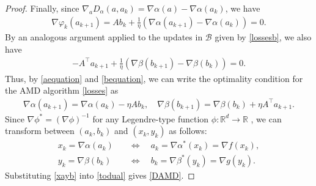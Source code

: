\documentclass[11pt]{article}
\newcommand{\R}{\mathbb{R}}
\newcommand{\B}{\mathcal{B}}
\begin{document}
\begin{proof}
    Finally, since $\nabla_{a}D_{\alpha}\left(a,a_{k}\right)=\nabla\alpha(a)-\nabla\alpha\left(a_{k}\right)$, we have
    \begin{gather}
        \nabla\varphi_k\left(a_{k+1}\right)=Ab_{k}+\frac{1}{\eta}\left(\nabla\alpha\left(a_{k+1}\right)-\nabla\alpha\left(a_{k}\right)\right)=0.\label{aequation}
    \end{gather}
    By an analogous argument applied to the updates in $\B$ given by \eqref{lossesb}, we also have
    \begin{gather}
        -A^{\top}a_{k+1}+\frac{1}{\eta}\left(\nabla\beta\left(b_{k+1}\right)-\nabla\beta\left(b_{k}\right)\right)=0.\label{bequation}
    \end{gather}
    Thus, by \eqref{aequation} and \eqref{bequation}, we can write the optimality condition for the AMD algorithm \eqref{losses} as
\begin{gather}\label{todual}
\nabla\alpha\left(a_{k+1}\right)=\nabla\alpha\left(a_{k}\right)-\eta Ab_{k}, \quad \nabla\beta\left(b_{k+1}\right)=\nabla\beta\left(b_{k}\right)+\eta A^{\top}a_{k+1}.
\end{gather}
Since $\nabla\phi^{*}=\left(\nabla\phi\right)^{-1}$ for any Legendre-type function $\phi:\R^{d}\rightarrow\R$ \citep[Theorem 26.5]{Rockafellar1996}, we can transform between $\left(a_k,b_k\right)$ and $\left(x_k,y_k\right)$ as follows:
\begin{subequations}\label{xayb}
\begin{align}
        x_k=\nabla\alpha\left(a_k\right)\quad&\iff\quad a_k=\nabla\alpha^{*}\left(x_k\right)=\nabla f\left(x_k\right),
    \\
    y_k=\nabla\beta\left(b_k\right)\quad&\iff\quad b_k=\nabla\beta^{*}\left(y_k\right)=\nabla g\left(y_k\right).
\end{align}
\end{subequations}
Substituting \eqref{xayb} into \eqref{todual} gives \eqref{DAMD}.
\end{proof}
\end{document}
